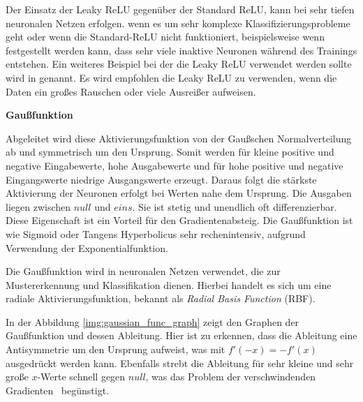 Der Einsatz der Leaky ReLU gegenüber der Standard ReLU, kann bei sehr tiefen neuronalen Netzen erfolgen. wenn es um sehr komplexe Klassifizierungsprobleme geht oder wenn die Standard-ReLU nicht funktioniert, beispielsweise wenn festgestellt werden kann, dass sehr viele inaktive Neuronen während des Trainings entstehen. Ein weiteres Beispiel bei der die Leaky ReLU verwendet werden sollte wird in \cite{rallabandi-2023} genannt. Es wird empfohlen die Leaky ReLU zu verwenden, wenn die Daten ein großes Rauschen oder viele Ausreißer aufweisen.\vspace{0.2cm}

%
\textbf{Gaußfunktion}\vspace{0.2cm}

Abgeleitet wird diese Aktivierungsfunktion von der Gaußschen Normalverteilung ab und symmetrisch um den Ursprung. Somit werden für kleine positive und negative Eingabewerte, hohe Ausgabewerte und für hohe positive und negative Eingangswerte niedrige Ausgangswerte erzeugt. Daraus folgt die stärkste Aktivierung der Neuronen erfolgt bei Werten nahe dem Ursprung. Die Ausgaben liegen zwischen $null$ und $eins$. Sie ist stetig und unendlich oft differenzierbar. Diese Eigenschaft ist ein Vorteil für den Gradientenabsteig. Die Gaußfunktion ist wie Sigmoid oder Tangens Hyperbolicus sehr rechenintensiv, aufgrund Verwendung der Exponentialfunktion.\vspace{0.2cm}

Die Gaußfunktion wird in neuronalen Netzen verwendet, die zur Mustererkennung und Klassifikation dienen. Hierbei handelt es sich um eine radiale Aktivierungsfunktion, bekannt als \textit{Radial Basis Function} (\acrshort{RBF}).



In der Abbildung \ref{img:gaussian_func_graph} zeigt den Graphen der Gaußfunktion und dessen Ableitung. Hier ist zu erkennen, dass die Ableitung eine Antisymmetrie um den Ursprung aufweist, was mit $f'(-x) = -f'(x)$ ausgedrückt werden kann. Ebenfalls strebt die Ableitung für sehr kleine und sehr große $x$-Werte schnell gegen $null$, was das \glqq Problem der verschwindenden Gradienten \grqq \ begünstigt.


